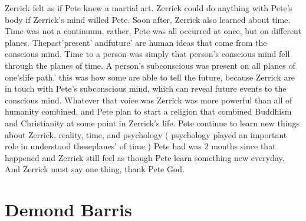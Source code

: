 \documentclass[12pt]{book}
\begin{document}
Zerrick felt as if Pete knew a martial art. Zerrick could do anything with Pete's body if Zerrick's mind willed Pete. Soon after, Zerrick also learned about time. Time was not a continuum, rather, Pete was all occurred at once, but on different planes. Thepast'present' andfuture' are human ideas that come from the conscious mind. Time to a person was simply that person's conscious mind fell through the planes of time. A person's subconscious was present on all planes of one'slife path.' this was how some are able to tell the future, because Zerrick are in touch with Pete's subconscious mind, which can reveal future events to the conscious mind. Whatever that voice was Zerrick was more powerful than all of humanity combined, and Pete plan to start a religion that combined Buddhism and Christianity at some point in Zerrick's life. Pete continue to learn new things about Zerrick, reality, time, and psychology ( psychology played an important role in understood theseplanes' of time ) Pete had was 2 months since that happened and Zerrick still feel as though Pete learn something new everyday. And Zerrick must say one thing, thank Pete God.



\chapter{Demond Barris}
\end{document}
